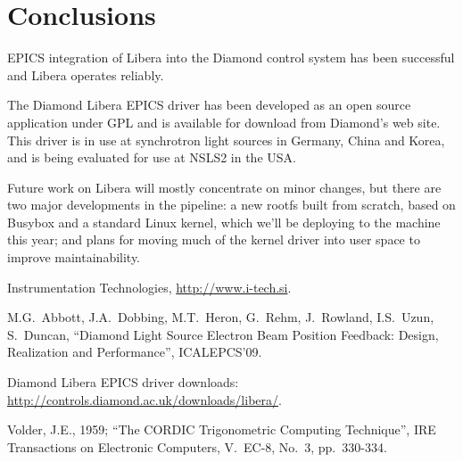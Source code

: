 \documentclass{JAC2003}
\begin{document}
\section{Conclusions}

EPICS integration of Libera into the Diamond control system has been
successful and Libera operates reliably.

The Diamond Libera EPICS driver has been developed as an open source
application under GPL and is available for download from Diamond's web
site\cite{libera-epics-web}.  This driver is in use at synchrotron light
sources in Germany, China and Korea, and is being evaluated for use at NSLS2
in the USA.

Future work on Libera will mostly concentrate on minor changes, but there are
two major developments in the pipeline: a new rootfs built from scratch, based
on Busybox and a standard Linux kernel, which we'll be deploying to the
machine this year; and plans for moving much of the kernel driver into user
space to improve maintainability.




\begin{thebibliography}{9}

Instrumentation Technologies, \url{http://www.i-tech.si}.

M.G.~Abbott, J.A.~Dobbing, M.T.~Heron, G.~Rehm, J.~Rowland, I.S.~Uzun,
S.~Duncan, ``Diamond Light Source Electron Beam Position Feedback: Design,
Realization and Performance'', ICALEPCS'09.


Diamond Libera EPICS driver downloads:
\url{http://controls.diamond.ac.uk/downloads/libera/}.

Volder, J.E., 1959; ``The CORDIC Trigonometric Computing Technique'', IRE
Transactions on Electronic Computers, V.~EC-8, No.~3, pp.~330-334.

\end{thebibliography}
\end{document}
